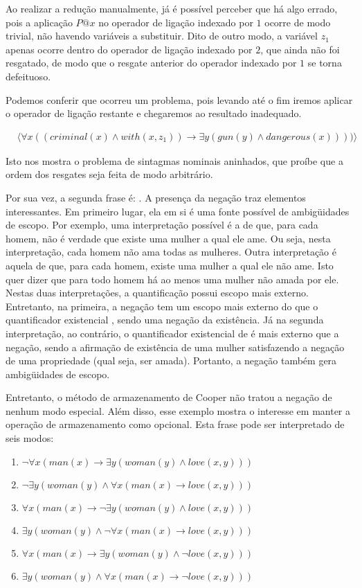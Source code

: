 Ao realizar a redução manualmente, já é possível perceber que há algo errado, pois a aplicação $P@x$ no operador de ligação indexado por $1$ ocorre de modo trivial, não havendo variáveis a substituir. Dito de outro modo, a variável $z_1$ apenas ocorre dentro do operador de ligação indexado por $2$, que ainda não foi resgatado, de modo que o resgate anterior do operador indexado por $1$ se torna defeituoso.

Podemos conferir que ocorreu um problema, pois levando até o fim iremos aplicar o operador de ligação restante e chegaremos ao resultado inadequado.

\begin{align*}
	& \langle \forall x ( (criminal(x) \land with(x,z_1)) \rightarrow \exists y ( gun(y) \land dangerous(x))))
	\rangle
\end{align*}

Isto nos mostra o problema de sintagmas nominais aninhados, que proíbe que a ordem dos resgates seja feita de modo arbitrário.

Por sua vez, a segunda frase é:  . A presença da negação traz elementos interessantes. Em primeiro lugar, ela em si é uma fonte possível de ambigüidades de escopo. Por exemplo, uma interpretação possível é a de que, para cada homem, não é verdade que existe uma mulher a qual ele ame. Ou seja, nesta interpretação, cada homem não ama todas as mulheres. Outra interpretação é aquela de que, para cada homem, existe uma mulher a qual ele não ame. Isto quer dizer que para todo homem há ao menos uma mulher não amada por ele. Nestas duas interpretações, a quantificação  possui escopo mais externo. Entretanto, na primeira, a negação tem um escopo mais externo do que o quantificador existencial , sendo uma negação da existência. Já na segunda interpretação, ao contrário, o quantificador existencial de  é mais externo que a negação, sendo a afirmação de existência de uma mulher satisfazendo a negação de uma propriedade (qual seja, ser amada). Portanto, a negação também gera ambigüidades de escopo.

Entretanto, o método de armazenamento de Cooper não tratou a negação de nenhum modo especial. Além disso, esse exemplo mostra o interesse em manter a operação de armazenamento como opcional. Esta frase pode ser interpretado de seis modos:
\begin{enumerate}
\item $\neg \forall x (man(x) \rightarrow \exists y (woman(y) \land love(x,y))) $
\item $\neg \exists y(woman(y) \land \forall x(man(x) \rightarrow love(x,y)))$
\item $\forall x (man(x) \rightarrow \neg \exists y (woman(y) \land love(x,y)))$
\item $\exists y(woman(y) \land \neg \forall x(man(x) \rightarrow love(x,y)))$
\item $\forall x (man(x) \rightarrow \exists y (woman(y) \land \neg love(x,y)))$
\item $\exists y(woman(y) \land \forall x(man(x) \rightarrow \neg love(x,y)))$
\end{enumerate}


